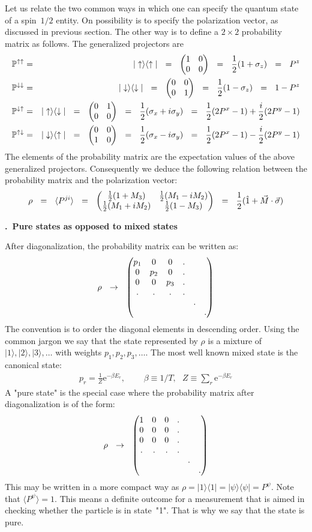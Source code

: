 \documentclass[onecolumn,fleqn, 11pt]{revtex4}
\newcommand{\eexp}{\mathrm{e}^}
\newcommand{\amatrix}[1]{\begin{matrix} #1 \end{matrix}}
\newcommand{\beq}{\begin{eqnarray}}
\newcommand{\eeq}{\end{eqnarray}}
\renewcommand{\thesubsection}{\arabic{subsection}}
\renewcommand{\thesubsubsection}{\arabic{subsubsection}}
\newcommand{\sheadC}[1]
{
\addtocounter{subsubsection}{1}
\vspace{5mm}
{\bf \thesubsection.\thesubsubsection \ #1}  
\nopagebreak
\phantomsection
}
\begin{document}
Let us relate the two common ways in which one can specify 
the quantum state of a spin~$1/2$ entity.
On possibility is to specify the polarization vector, 
as discussed in previous section. 
The other way is to define a $2\times2$ 
probability matrix as follows. 
The generalized projectors are 
\beq
\mathbb{P}^{ \uparrow \uparrow} 
&=& |\uparrow \rangle\langle \uparrow| 
\ \ = \ \ \left(\amatrix{1&0\cr 0&0}\right)
\ \ = \ \ \frac{1}{2}(1 + \sigma_z) 
\ \ = \ \ P^{z}
\\ \nonumber
\mathbb{P}^{ \downarrow \downarrow } 
&=&  |\downarrow \rangle\langle \downarrow| 
\ \ = \ \ \left(\amatrix{0&0\cr 0&1}\right) 
\ \ = \ \ \frac{1}{2}(1 - \sigma_z) 
\ \ = \ \ 1-P^{z}
\\ \nonumber
\mathbb{P}^{\downarrow \uparrow} 
&=& |\uparrow \rangle\langle \downarrow| 
\ \ = \ \ \left(\amatrix{0&1\cr 0&0}\right)
\ \ = \ \ \frac{1}{2}(\sigma_x + i \sigma_y) 
\ \ = \ \ \frac{1}{2}(2P^x-1)+\frac{i}{2}(2P^y-1)
\\ \nonumber
\mathbb{P}^{ \uparrow \downarrow} 
&=& |\downarrow \rangle\langle \uparrow| 
\ \ = \ \ \left(\amatrix{0&0\cr 1&0}\right)
\ \ = \ \ \frac{1}{2}(\sigma_x -i \sigma_y) 
\ \ = \ \ \frac{1}{2}(2P^x-1)-\frac{i}{2}(2P^y-1)
\eeq
The elements of the probability matrix 
are the expectation values of the above 
generalized projectors. 
Consequently we deduce the following relation 
between the probability matrix 
and the polarization vector:
\beq
\rho 
\ \ = \ \ 
\langle P^{ji} \rangle 
\ \ = \ \ 
\left( \amatrix{ \frac{1}{2}(1+M_3)& \frac{1}{2}(M_1-iM_2)\cr \frac{1}{2}(M_1+iM_2)& \frac{1}{2}(1-M_3)} \right) 
\ \ = \ \ 
\frac{1}{2}(\hat{1}+\vec{M} \cdot \vec{\sigma}) 
\eeq

 
\sheadC{Pure states as opposed to mixed states}

After diagonalization, the probability matrix can be written as:
\beq
\rho \ \ \rightarrow \ \ \left(\amatrix{p_1&0&0&.\cr 0&p_2&0&.\cr 0&0&p_3&.\cr .&.&.&.\cr &&&&.\cr &&&&&.}\right) 
\eeq
The convention is to order the diagonal elements in descending order.
Using the common jargon we say that the state represented 
by $\rho$ is a mixture of ${|1 \rangle , |2 \rangle , |3 \rangle, \dots }$
with weights ${p_1, p_2, p_3, \dots }$.
The most well known mixed state is the canonical state:
\beq
p_r = \frac{1}{Z} \eexp{- \beta E_r}, 
\ \ \ \ \ \ \ \ \ \ \beta\equiv1/T, 
\ \ \ Z\equiv \sum_r \eexp{- \beta E_r}
\eeq
A "pure state" is the special case where the probability matrix 
after diagonalization is of the form:
\beq
\rho \ \ \rightarrow \ \ \left(\amatrix{1&0&0&.\cr 0&0&0&.\cr 0&0&0&.\cr .&.&.&.\cr &&&&.\cr &&&&&.} \right) 
\eeq
This may be written in a more compact 
way as ${\rho = |1 \rangle \langle 1| =| \psi \rangle \langle \psi| = P^{\psi} }$. 
Note that $\langle P^{\psi} \rangle = 1$. This means a definite  
outcome for a measurement that is aimed in checking whether 
the particle is in state~"1". That is why we say that the state is pure. 
\end{document}
